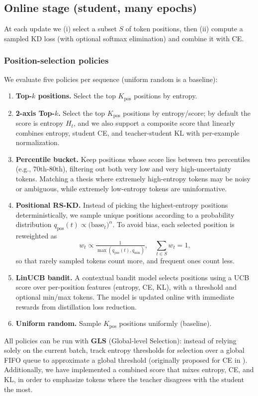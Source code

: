 \documentclass[11pt]{article}
\begin{document}
\subsection{Online stage (student, many epochs)}
At each update we (i) select a subset $S$ of token positions, then (ii) compute a sampled KD loss (with optional softmax elimination) and combine it with CE.

\subsubsection{Position-selection policies}
We evaluate five policies per sequence (uniform random is a baseline):
\begin{enumerate}
	\item \textbf{Top-$k$ positions.} Select the top $K_{\text{pos}}$ positions by entropy.
	\item \textbf{2-axis Top-$k$.} Select the top $K_{\text{pos}}$ positions by entropy/score; by default the score is entropy $H_t$, and we also support a composite score that linearly combines entropy, student CE, and teacher-student KL with per-example normalization.
	\item \textbf{Percentile bucket.} Keep positions whose score lies between two percentiles (e.g., 70th-80th), filtering out both very low and very high-uncertainty tokens. Matching a thesis where extremely high-entropy tokens may be noisy or ambiguous, while extremely low-entropy tokens are uninformative.
	\item \textbf{Positional RS-KD.} Instead of picking the highest-entropy positions deterministically, we sample unique positions according to a probability distribution $q_{\text{pos}}(t)\propto \big(\text{base}_t\big)^{\alpha}$. To avoid bias, each selected position is reweighted as
	      \[
		      w_t \propto  \tfrac{1}{\max(q_{\text{pos}}(t),q_{\min})},\quad \sum_{t\in S}w_t=1,
	      \]
	      so that rarely sampled tokens count more, and frequent ones count less.
	\item \textbf{LinUCB bandit.} A contextual bandit model selects positions using a UCB score over per-position features (entropy, CE, KL), with a threshold and optional min/max tokens. The model is updated online with immediate rewards from distillation loss reduction.
	\item \textbf{Uniform random.} Sample $K_{\text{pos}}$ positions uniformly (baseline).
\end{enumerate}
All policies can be run with \textbf{GLS} (Global-level Selection): instead of relying solely on the current batch, track entropy thresholds for selection over a global FIFO queue to approximate a global threshold (originally proposed for CE in \citet{wang2021selectivekd}).
Additionally, we have implemented a combined score that mixes entropy, CE, and KL, in order to emphasize tokens where the teacher disagrees with the student the most.
\end{document}
